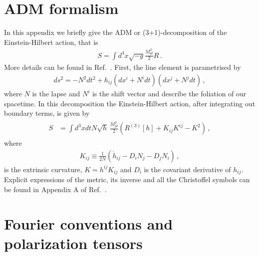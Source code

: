 \documentclass[a4paper,11pt]{article}
\numberwithin{equation}{section}
\begin{document}
\section{ADM formalism\label{app:ADM}}
In this appendix we briefly give the ADM or (3+1)-decomposition of the Einstein-Hilbert action, that is
\begin{align}
S=\int d^4x \sqrt{-g} \frac{M_{pl}^{2}}{2}R\,.
\end{align}
More details can be found in Ref.~\cite{Poisson:2009pwt}. First, the line element is parametrised by
\begin{align}
ds^2=-N^2dt^2+h_{ij}\left(dx^i+N^idt\right)\left(dx^j+N^jdt\right)\,,
\end{align}
where $N$ is the lapse and $N^i$ is the shift vector and describe the foliation of our spacetime. In this decomposition the Einstein-Hilbert action, after integrating out boundary terms, is given by
\begin{align}
\begin{split}
S&=\int d^3x dt N \sqrt{h}\,\frac{M_{pl}^{2}}{2}\left(R^{(3)}[h]+K_{ij}K^{ij}-K^2\right)\,,
\end{split}
\end{align}
where 
\begin{align}
K_{ij}\equiv\frac{1}{2N}\left(\dot{h}_{ij}-D_{i}N_{j}-D_{j}N_{i}\right)\,,
\end{align}
is the extrinsic curvature, $K=h^{ij}K_{ij}$ and $D_i$ is the covariant derivative of $h_{ij}$. Explicit expressions of the metric, its inverse and all the Christoffel symbols can be found in Appendix A of Ref.~\cite{Deffayet:2015qwa}.

\section{Fourier conventions and polarization tensors\label{app:polarization}}
\end{document}
